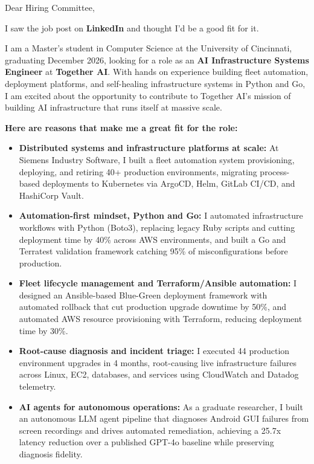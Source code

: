 \documentclass[11pt]{letter}
\date{}
\begin{document}
\begin{letter}{}

\opening{Dear Hiring Committee,}

I saw the job post on \textbf{LinkedIn} and thought I'd be a good fit for it.

I am a Master's student in Computer Science at the University of Cincinnati, graduating December 2026, looking for a role as an \textbf{AI Infrastructure Systems Engineer} at \textbf{Together AI}. With hands on experience building fleet automation, deployment platforms, and self-healing infrastructure systems in Python and Go, I am excited about the opportunity to contribute to Together AI's mission of building AI infrastructure that runs itself at massive scale.

\textbf{Here are reasons that make me a great fit for the role:}

\begin{itemize}[leftmargin=*, itemsep=0.45em]
    \item \textbf{Distributed systems and infrastructure platforms at scale:} At Siemens Industry Software, I built a fleet automation system provisioning, deploying, and retiring 40+ production environments, migrating process-based deployments to Kubernetes via ArgoCD, Helm, GitLab CI/CD, and HashiCorp Vault.

    \item \textbf{Automation-first mindset, Python and Go:} I automated infrastructure workflows with Python (Boto3), replacing legacy Ruby scripts and cutting deployment time by 40\% across AWS environments, and built a Go and Terratest validation framework catching 95\% of misconfigurations before production.

    \item \textbf{Fleet lifecycle management and Terraform/Ansible automation:} I designed an Ansible-based Blue-Green deployment framework with automated rollback that cut production upgrade downtime by 50\%, and automated AWS resource provisioning with Terraform, reducing deployment time by 30\%.

    \item \textbf{Root-cause diagnosis and incident triage:} I executed 44 production environment upgrades in 4 months, root-causing live infrastructure failures across Linux, EC2, databases, and services using CloudWatch and Datadog telemetry.

    \item \textbf{AI agents for autonomous operations:} As a graduate researcher, I built an autonomous LLM agent pipeline that diagnoses Android GUI failures from screen recordings and drives automated remediation, achieving a 25.7x latency reduction over a published GPT-4o baseline while preserving diagnosis fidelity.
\end{itemize}


\end{letter}
\end{document}
